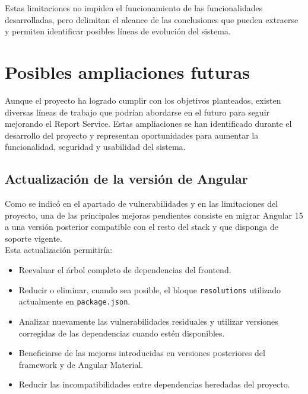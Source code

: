 \documentclass[11pt,a4paper,titlepage,oneside]{report}
\begin{document}
Estas limitaciones no impiden el funcionamiento de las funcionalidades
desarrolladas, pero delimitan el alcance de las conclusiones que pueden
extraerse y permiten identificar posibles líneas de evolución del sistema. \\

\section{Posibles ampliaciones futuras}

Aunque el proyecto ha logrado cumplir con los objetivos planteados, existen diversas líneas de trabajo que podrían abordarse en el futuro para seguir mejorando el Report Service. Estas ampliaciones se han identificado durante el desarrollo del proyecto y representan oportunidades para aumentar la funcionalidad, seguridad y usabilidad del sistema.

\subsection{Actualización de la versión de Angular}

Como se indicó en el apartado de vulnerabilidades y en las limitaciones del
proyecto, una de las principales mejoras pendientes consiste en migrar
Angular 15 a una versión posterior compatible con el resto del stack y que
disponga de soporte vigente. \\

Esta actualización permitiría:

\begin{itemize}

  \item Reevaluar el árbol completo de dependencias del frontend.

  \item Reducir o eliminar, cuando sea posible, el bloque
  \texttt{resolutions} utilizado actualmente en
  \texttt{package.json}.

  \item Analizar nuevamente las vulnerabilidades residuales y utilizar
  versiones corregidas de las dependencias cuando estén disponibles.

  \item Beneficiarse de las mejoras introducidas en versiones posteriores del
  framework y de Angular Material.

  \item Reducir las incompatibilidades entre dependencias heredadas del
  proyecto.

\end{itemize}
\end{document}
